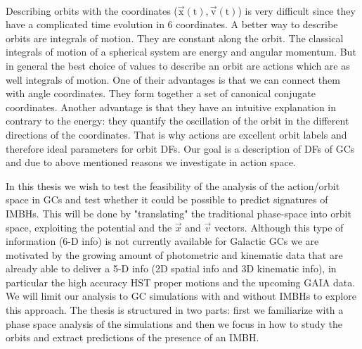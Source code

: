 \\\par Describing orbits with the coordinates (\(\vec{\mathrm{x}}(\mathrm{t}),\vec{\mathrm{v}}(\mathrm{t})\)) is very difficult since they have a complicated time evolution in 6 coordinates. A better way to describe orbits are integrals of motion. They are constant along the orbit. The classical integrals of motion of a spherical system are energy and angular momentum. But in general the best choice of values to describe an orbit are actions which are as well integrals of motion. One of their advantages is that we can connect them with angle coordinates. They form together a set of canonical conjugate coordinates. Another advantage is that they have an intuitive explanation in contrary to the energy: they quantify the oscillation of the orbit in the different directions of the coordinates. That is why actions are excellent orbit labels and therefore ideal parameters for orbit \acp{DF}. Our goal is a description of \acp{DF} of \acp{GC} and due to above mentioned reasons we investigate in action space.
\\\par In this thesis we wish to test the feasibility of the analysis of the action/orbit space in \acp{GC} and test whether it could be possible to predict  signatures of \acp{IMBH}. This will be done by "translating" the traditional phase-space into orbit space, exploiting the potential and the \(\vec{x}\) and \(\vec{v}\) vectors. Although this type of information (6-D info) is not currently available for Galactic \acp{GC} we are motivated by the growing amount of photometric and kinematic data that are already able to deliver a 5-D info (2D spatial info and 3D kinematic info), in particular the high accuracy \ac{HST} proper motions and the upcoming GAIA data. We will limit our analysis to \ac{GC} simulations with and without \acp{IMBH} to explore this approach. The thesis is structured in two parts: first we familiarize with a phase space analysis of the simulations and then we focus in how to study the orbits and extract predictions of the presence of an \ac{IMBH}.

